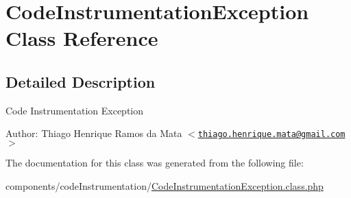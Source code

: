 \hypertarget{class_code_instrumentation_exception}{
\section{CodeInstrumentationException Class Reference}
\label{class_code_instrumentation_exception}
}


\subsection{Detailed Description}
Code Instrumentation Exception

\begin{Desc}
\item[Author:]Thiago Henrique Ramos da Mata $<$\href{mailto:thiago.henrique.mata@gmail.com}{\tt thiago.henrique.mata@gmail.com}$>$ \end{Desc}


The documentation for this class was generated from the following file:\begin{CompactItemize}
\item 
components/codeInstrumentation/\hyperlink{_code_instrumentation_exception_8class_8php}{CodeInstrumentationException.class.php}\end{CompactItemize}
